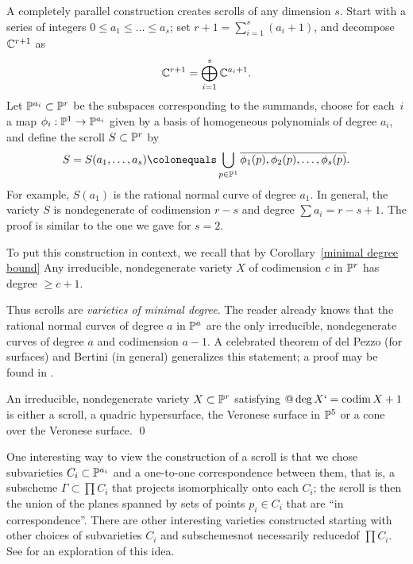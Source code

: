 A completely parallel construction creates 
scrolls of
any dimension $s$. Start with a series of integers $0 \leq a_1 \leq
\dots \leq a_s$;
\label{thescroll}
set $r + 1 = \sum_{i=1}^{s}(a_{i}+1)$,  and
decompose ${\mathbb C}^{r+1}$ as
$$
{\mathbb C}^{r+1} = \bigoplus_{i=1}^{s}{\mathbb C}^{a_{i}+1}.
$$
Let ${\mathbb P}^{a_{i}}\subset {\mathbb P}^{r}$ be the subspaces corresponding to the
summands,  choose for each~$i$ a
map $\phi_i : {\mathbb P}^1 \to {\mathbb P}^{a_{i}}$  given by a basis of homogeneous
polynomials of degree $a_i$, and define the scroll $S \subset {\mathbb P}^{r}$ by
$$
S=S(a_{1}, \dots, a_{s}) \colonequals  \bigcup_{p\in
\PP^{1}}\overline{\phi_1(p), \phi_{2}(p), \dots, \phi_{s}(p)}.
$$
For example, $S(a_{1})$ is the rational normal curve of degree $a_{1}$. In
general, the variety $S$ is nondegenerate of codimension $r-s$ and degree
$\sum a_{i} = r-s+1$. The proof is similar to the one we gave for $s=2$.

To put this construction in context, we recall that by
Corollary~\ref{minimal degree bound}
Any irreducible, nondegenerate variety $X$ of codimension $c$ in
${\mathbb P}^{r}$ has degree $\geq c +1$.

Thus scrolls are \emph{varieties of minimal degree}. The reader already
%
knows that the rational normal curves of degree $a$ in ${\mathbb P}^{a}$ are the
only irreducible, nondegenerate curves of degree $a$ and codimension
$a-1$. A celebrated theorem of del Pezzo (for surfaces) and Bertini
%
%
(in general) generalizes this statement;
a proof may be found in \cite{Eisenbud-Harris-Centennial}.

\begin{theorem}\label{classification of scrolls}
An
irreducible, nondegenerate variety $X\subset {\mathbb P}^{r}$  
satisfying
$@\deg X `=
\operatorname{codim} X+1$ is either a 
scroll, a quadric hypersurface,
the Veronese surface in ${\mathbb P}^{5}$ or a cone over the Veronese surface.
\qed
\end{theorem}

One interesting way to view the construction of a scroll is that we chose
subvarieties $C_{i}\subset {\mathbb P}^{a_{i}}$ and a one-to-one correspondence
between them, that is, a subscheme
$\Gamma\subset \prod C_{i}$ that projects isomorphically onto each
$C_{i}$; the scroll is then the
union of the planes spanned by sets of points $p_{i}\in C_{i}$ that
are ``in correspondence''. There are other interesting varieties
constructed starting with other choices of subvarieties $C_{i}$ and
subschemes\emdash not necessarily reduced\emdash of $\prod C_{i}$. See
%
\cite{Eisenbud-Sammartano} for an exploration of this idea.

